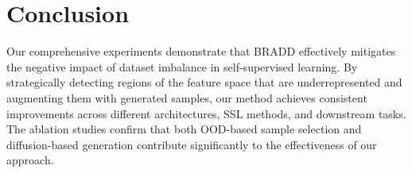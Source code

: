 \section{Conclusion}
Our comprehensive experiments demonstrate that BRADD effectively mitigates the negative impact of dataset imbalance in self-supervised learning. By strategically detecting regions of the feature space that are underrepresented and augmenting them with generated samples, our method achieves consistent improvements across different architectures, SSL methods, and downstream tasks. The ablation studies confirm that both OOD-based sample selection and diffusion-based generation contribute significantly to the effectiveness of our approach.